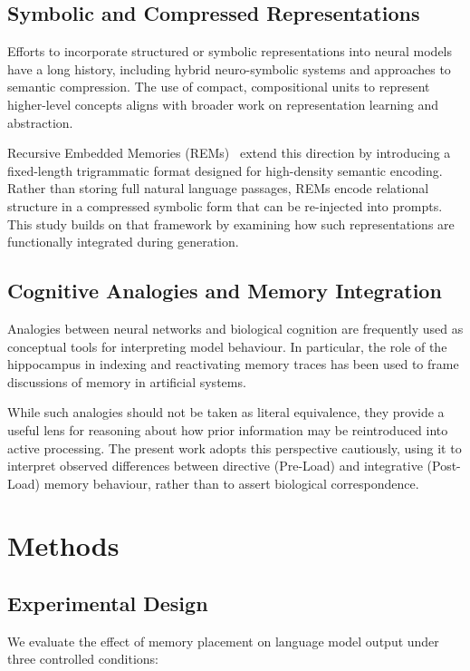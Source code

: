 \documentclass[11pt]{article}
\begin{document}
\subsection{Symbolic and Compressed Representations}

Efforts to incorporate structured or symbolic representations into neural models have a long history, including hybrid neuro-symbolic systems and approaches to semantic compression. The use of compact, compositional units to represent higher-level concepts aligns with broader work on representation learning and abstraction.

Recursive Embedded Memories (REMs)~\cite{Ley2026} extend this direction by introducing a fixed-length trigrammatic format designed for high-density semantic encoding. Rather than storing full natural language passages, REMs encode relational structure in a compressed symbolic form that can be re-injected into prompts. This study builds on that framework by examining how such representations are functionally integrated during generation.

\subsection{Cognitive Analogies and Memory Integration}

Analogies between neural networks and biological cognition are frequently used as conceptual tools for interpreting model behaviour. In particular, the role of the hippocampus in indexing and reactivating memory traces has been used to frame discussions of memory in artificial systems.

While such analogies should not be taken as literal equivalence, they provide a useful lens for reasoning about how prior information may be reintroduced into active processing. The present work adopts this perspective cautiously, using it to interpret observed differences between directive (Pre-Load) and integrative (Post-Load) memory behaviour, rather than to assert biological correspondence.

\section{Methods}

\subsection{Experimental Design}

We evaluate the effect of memory placement on language model output under three controlled conditions:
\end{document}
